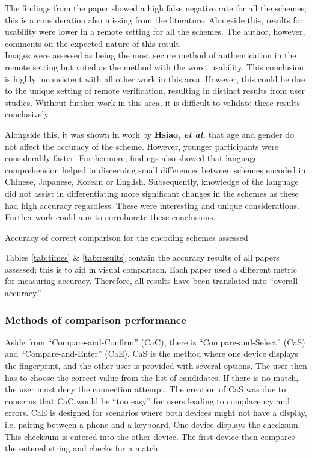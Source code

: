 The findings from the paper showed a high false negative rate for all the schemes; this is a consideration also missing from the literature. Alongside this, results for usability were lower in a remote setting for all the schemes. The author, however, comments on the expected nature of this result.\\
Images were assessed as being the most secure method of authentication in the remote setting but voted as the method with the worst usability. This conclusion is highly inconsistent with all other work in this area. However, this could be due to the unique setting of remote verification, resulting in distinct results from user studies. Without further work in this area, it is difficult to validate these results conclusively.

Alongside this, it was shown in work by \textbf{Hsiao, \textit{et al.}}\cite{hsiao2009study} that age and gender do not affect the accuracy of the scheme. However, younger participants were considerably faster. Furthermore, findings also showed that language comprehension helped in discerning small differences between schemes encoded in Chinese, Japanese, Korean or English. Subsequently, knowledge of the language did not assist in differentiating more significant changes in the schemes as these had high accuracy regardless. These were interesting and unique considerations. Further work could aim to corroborate these conclusions.

\begin{table}[h!]
    \makebox[\textwidth][c]{
        
    }%
    \caption{Accuracy of correct comparison for the encoding schemes assessed}
    \label{tab:results}
\end{table}

Tables \ref{tab:times} \& \ref{tab:results} contain the accuracy results of all papers assessed; this is to aid in visual comparison. Each paper used a different metric for measuring accuracy. Therefore, all results have been translated into ``overall accuracy.''

\subsubsection*{Methods of comparison performance}
Aside 
from ``Compare-and-Confirm'' (CaC), there is ``Compare-and-Select'' (CaS) and ``Compare-and-Enter'' (CaE). CaS is the method where one device displays the fingerprint, and the other user is provided with several options. The user then has to choose the correct value from the list of candidates. If there is no match, the user must deny the connection attempt. The creation of CaS was due to concerns that CaC would be ``too easy'' for users leading to complacency and errors\cite{uzun2007usability}. CaE is designed for scenarios where both devices might not have a display, i.e. pairing between a phone and a keyboard. One device displays the checksum. This checksum is entered into the other device. The first device then compares the entered string and checks for a match.

